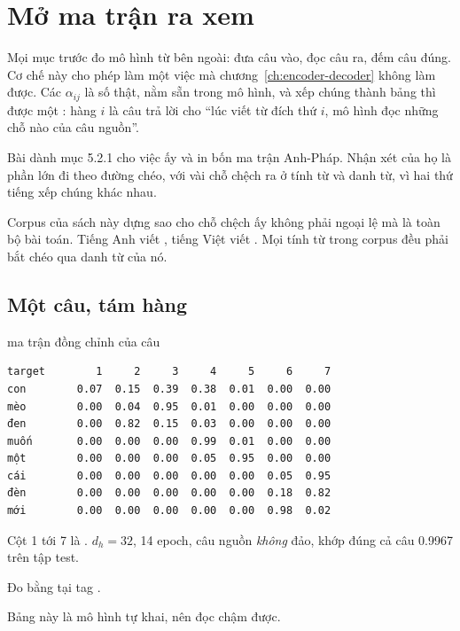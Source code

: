 \section{Mở ma trận ra xem}
\label{sec:ch06-mo-ma-tran}

%
Mọi mục trước đo mô hình từ bên ngoài: đưa câu vào, đọc câu ra, đếm câu đúng.
Cơ chế này cho phép làm một việc mà chương~\ref{ch:encoder-decoder} không làm
được. Các \(\alpha_{ij}\) là số thật, nằm sẵn trong mô hình, và xếp chúng thành
bảng thì được một : hàng \(i\) là câu
trả lời cho \enquote{lúc viết từ đích thứ \(i\), mô hình đọc những chỗ nào của
câu nguồn}.

Bài dành mục 5.2.1 cho việc ấy và in bốn ma trận Anh-Pháp. Nhận xét của họ là
 phần lớn đi theo đường chéo, với vài chỗ chệch ra ở
tính từ và danh
từ, vì hai thứ tiếng xếp chúng khác nhau.

Corpus của sách này dựng sao cho chỗ chệch ấy không phải ngoại lệ mà là toàn bộ
bài toán. Tiếng Anh viết , tiếng Việt viết . Mọi
tính từ trong corpus đều phải bắt chéo qua danh từ của nó.

\subsection*{Một câu, tám hàng}

\begin{measured}{ma trận đồng chỉnh của câu }
\begin{verbatim}
target        1     2     3     4     5     6     7
con        0.07  0.15  0.39  0.38  0.01  0.00  0.00
mèo        0.00  0.04  0.95  0.01  0.00  0.00  0.00
đen        0.00  0.82  0.15  0.03  0.00  0.00  0.00
muốn       0.00  0.00  0.00  0.99  0.01  0.00  0.00
một        0.00  0.00  0.00  0.05  0.95  0.00  0.00
cái        0.00  0.00  0.00  0.00  0.00  0.05  0.95
đèn        0.00  0.00  0.00  0.00  0.00  0.18  0.82
mới        0.00  0.00  0.00  0.00  0.00  0.98  0.02
\end{verbatim}

Cột 1 tới 7 là . \(d_h = 32\), 14 epoch,
câu nguồn \emph{không} đảo, khớp đúng cả câu 0.9967 trên tập test.

Đo bằng  tại tag .
\end{measured}

Bảng này là mô hình tự khai, nên đọc chậm được.

